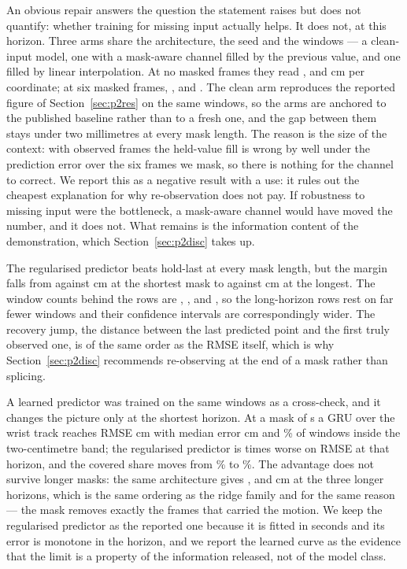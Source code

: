 \documentclass{swmcmthesis}
\begin{document}
An obvious repair answers the question the statement raises but does not quantify:
whether training for missing input actually helps. It does not, at this horizon. Three
arms share the architecture, the seed and the windows --- a clean-input model, one with a
mask-aware channel filled by the previous value, and one filled by linear interpolation.
At no masked frames they read \slotPCleanZero{}, \slotPLocfZero{} and \slotPInterpZero{}
cm per coordinate; at six masked frames, \slotPCleanSix{}, \slotPLocfSix{} and
\slotPInterpSix{}. The clean arm reproduces the reported figure of
Section~\ref{sec:p2res} on the same windows, so the arms are anchored to the published
baseline rather than to a fresh one, and the gap between them stays under two millimetres
at every mask length. The reason is the size of the context: with \slotCtx{} observed
frames the held-value fill is wrong by well under the prediction error over the six frames
we mask, so there is nothing for the channel to correct. We report this as a negative
result with a use: it rules out the cheapest explanation for why re-observation does not
pay. If robustness to missing input were the bottleneck, a mask-aware channel would have
moved the number, and it does not. What remains is the information content of the
demonstration, which Section~\ref{sec:p2disc} takes up.



The regularised predictor beats hold-last at every mask length, but the margin
falls from \slotPTwoARidgeRMSE{} against \slotPTwoAHoldRMSE{} cm at the shortest
mask to \slotPTwoDRidgeRMSE{} against \slotPTwoDHoldRMSE{} cm at the longest. The
window counts behind the rows are \slotPTwoWinA{}, \slotPTwoWinB{},
\slotPTwoWinC{} and \slotPTwoWinD{}, so the long-horizon rows rest on far fewer
windows and their confidence intervals are correspondingly wider. The recovery
jump, the distance between the last predicted point and the first truly observed
one, is of the same order as the RMSE itself, which is why Section~\ref{sec:p2disc}
recommends re-observing at the end of a mask rather than splicing.

A learned predictor was trained on the same windows as a cross-check, and it
changes the picture only at the shortest horizon. At a mask of \slotMaskA{} s a GRU
over the wrist track reaches RMSE \slotPGPUAWristRMSE{} cm with median error
\slotPGPUAWristMedian{} cm and \slotPGPUAWristWithinTwo{}\% of windows inside the
two-centimetre band; the regularised predictor is \slotPGpuRatio{} times worse on
RMSE at that horizon, and the covered share moves from
\slotPTwoARidgeWithinTwo{}\% to \slotPGPUAWristWithinTwo{}\%. The advantage does not
survive longer masks: the same architecture gives \slotPGPUBSTwoRMSE{},
\slotPGPUCBothRMSE{} and \slotPGPUDBothRMSE{} cm at the three longer horizons, which
is the same ordering as the ridge family and for the same reason --- the mask removes
exactly the frames that carried the motion. We keep the regularised predictor as the
reported one because it is fitted in seconds and its error is monotone in the
horizon, and we report the learned curve as the evidence that the limit is a
property of the information released, not of the model class.
\end{document}
